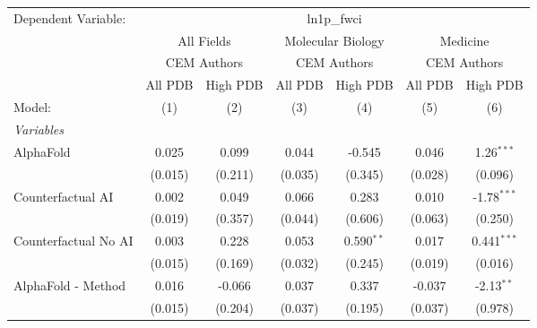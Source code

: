 \begingroup
\centering
\begin{tabular}{lcccccc}
   \tabularnewline \midrule \midrule
   Dependent Variable: & \multicolumn{6}{c}{ln1p\_fwci}\\
 & \multicolumn{2}{c}{All Fields} & \multicolumn{2}{c}{Molecular Biology} & \multicolumn{2}{c}{Medicine} \\
\cmidrule(lr){2-3} \cmidrule(lr){4-5} \cmidrule(lr){6-7}
 & \multicolumn{2}{c}{CEM Authors} & \multicolumn{2}{c}{CEM Authors} & \multicolumn{2}{c}{CEM Authors} \\
\cmidrule(lr){2-3} \cmidrule(lr){4-5} \cmidrule(lr){6-7}
 & \multicolumn{1}{c}{All PDB} & \multicolumn{1}{c}{High PDB} & \multicolumn{1}{c}{All PDB} & \multicolumn{1}{c}{High PDB} & \multicolumn{1}{c}{All PDB} & \multicolumn{1}{c}{High PDB} \\
\cmidrule(lr){2-2} \cmidrule(lr){3-3} \cmidrule(lr){4-4} \cmidrule(lr){5-5} \cmidrule(lr){6-6} \cmidrule(lr){7-7}
   Model:                                                     & (1)         & (2)        & (3)     & (4)          & (5)     & (6)\\  
   \midrule
   \emph{Variables}\\
   AlphaFold                                                  & 0.025       & 0.099      & 0.044   & -0.545       & 0.046   & 1.26$^{***}$\\   
                                                              & (0.015)     & (0.211)    & (0.035) & (0.345)      & (0.028) & (0.096)\\   
   Counterfactual AI                                          & 0.002       & 0.049      & 0.066   & 0.283        & 0.010   & -1.78$^{***}$\\   
                                                              & (0.019)     & (0.357)    & (0.044) & (0.606)      & (0.063) & (0.250)\\   
   Counterfactual No AI                                       & 0.003       & 0.228      & 0.053   & 0.590$^{**}$ & 0.017   & 0.441$^{***}$\\   
                                                              & (0.015)     & (0.169)    & (0.032) & (0.245)      & (0.019) & (0.016)\\   
   AlphaFold - Method                                         & 0.016       & -0.066     & 0.037   & 0.337        & -0.037  & -2.13$^{**}$\\   
                                                              & (0.015)     & (0.204)    & (0.037) & (0.195)      & (0.037) & (0.978)\\   

\end{tabular}
